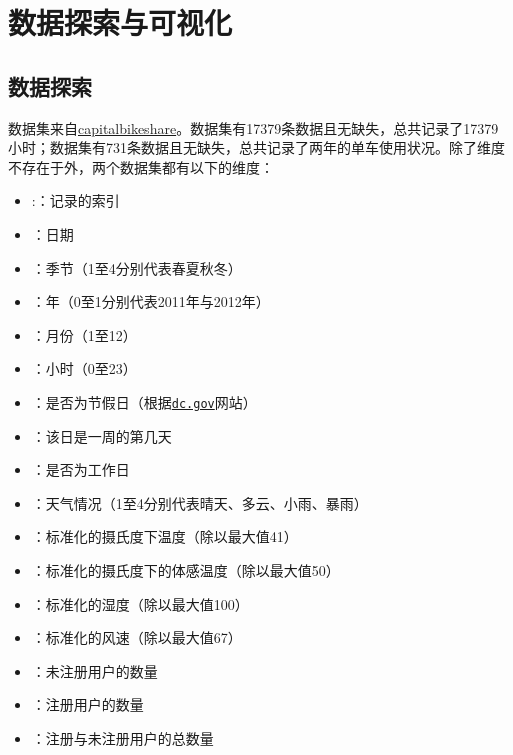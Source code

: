 \section{数据探索与可视化}
\subsection{数据探索}
数据集来自\href{http://capitalbikeshare.com/system-data}{capitalbikeshare}\cite{data}。数据集有17379条数据且无缺失，总共记录了17379小时；数据集有731条数据且无缺失，总共记录了两年的单车使用状况。除了维度不存在于外，两个数据集都有以下的维度：
\begin{itemize}
    \item {}:：记录的索引
    \item {}：日期
    \item {}：季节（1至4分别代表春夏秋冬）
    \item {}：年（0至1分别代表2011年与2012年）
    \item {}：月份（1至12）
    \item {}：小时（0至23）
    \item {}：是否为节假日（根据\href{http://dchr.dc.gov/page/holiday-schedule}{\texttt{dc.gov}}网站）
    \item {}：该日是一周的第几天
    \item {}：是否为工作日
    \item {}：天气情况（1至4分别代表晴天、多云、小雨、暴雨）
    \item {}：标准化的摄氏度下温度（除以最大值41）
    \item {}：标准化的摄氏度下的体感温度（除以最大值50）
    \item {}：标准化的湿度（除以最大值100）
    \item {}：标准化的风速（除以最大值67）
    \item {}：未注册用户的数量
    \item {}：注册用户的数量
    \item {}：注册与未注册用户的总数量
\end{itemize}

